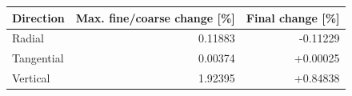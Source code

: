 \begin{tabular}{lrr}
\toprule
Direction & Max. fine/coarse change [\%] & Final change [\%] \\
\midrule
Radial & 0.11883 & -0.11229 \\
Tangential & 0.00374 & +0.00025 \\
Vertical & 1.92395 & +0.84838 \\
\bottomrule
\end{tabular}

